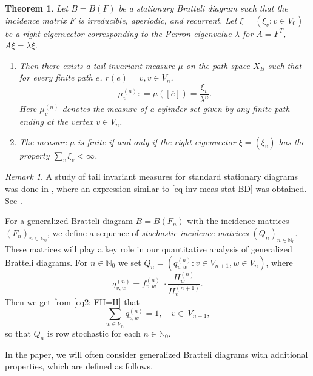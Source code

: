 \documentclass[11pt,reqno]{amsart}
\theoremstyle{definition}
\theoremstyle{remark}
\newtheorem{remark}[definition]{Remark}
\theoremstyle{plain}
\newtheorem{thm}[definition]{Theorem}
\def\ol{\overline}
\newcommand{\N}{\mathbb N}
\newcommand{\be}{\begin{equation}}
\newcommand{\ee}{\end{equation}}
\numberwithin{equation}{section}
\begin{document}
\begin{thm} \label{thm PFThm} Let $B = B(F)$ be a stationary Bratteli diagram such 
that the incidence matrix $F$ is 
irreducible, aperiodic, and recurrent. Let $\xi = (\xi_v : v \in V_0)$ be a right eigenvector corresponding to the Perron eigenvalue
$\lambda$ for $A= F^{T}$, $A\xi = \lambda \xi$. 

\begin{enumerate}
    \item Then there exists a tail invariant measure $\mu$ on the path space $X_B$ such that for every finite path $\ol e$, $r(\ol e) = v, v \in V_n $, 
 \be\label{eq inv meas stat BD}
\mu^{(n)}_v : =  \mu([\ol e]) = \frac{\xi_v}{\lambda^{n}}.
\ee 
Here $\mu^{(n)}_v$ denotes the measure of a cylinder set given by any finite path ending at the vertex $v \in V_n$.

\item The measure $\mu$ is finite if and only if the right eigenvector
$\xi = (\xi_v)$ has the property $\sum_v \xi_v <\infty$.
\end{enumerate}
\end{thm} 



\begin{remark}\label{Standard_stationary} A study of tail invariant measures for standard stationary diagrams was done in \cite{BezuglyiKwiatkowskiMedynetsSolomyak2010}, where an expression similar to \eqref{eq inv meas stat BD} was obtained. See \cite[Remark 3.9.]{BezuglyiKwiatkowskiMedynetsSolomyak2010}.
\end{remark}



For a generalized Bratteli diagram $B = B(F_n)$ with the incidence matrices $(F_n)_{n \in \N_0}$, we define a sequence of \textit{stochastic incidence matrices} $(Q_n)_{n \in \N_0}$. These matrices will play a key role in our quantitative analysis of generalized Bratteli diagrams. For $n \in \N_0$ we set
$Q_n = (q_{v,w}^{(n)} : v \in V_{n+1}, w \in V_n)$, where 
\be\label{eq_stoch matrix Q_n}
q_{v,w}^{(n)} =  {f}_{v,w}^{(n)}\ \cdot \frac{H_{w}^{(n)}}
{H_{v}^{(n + 1)}}.
\ee
Then we get from \eqref{eq2: FH=H} that 
\begin{equation}\label{e7}
\sum_{w \in V_{n}}q_{v,w}^{(n)} =1, \quad v \in\ 
V_{n + 1},  
\end{equation}
so that $Q_n$ is row stochastic for each $n \in \N_0$. 
\medskip 

In the paper, we will often consider generalized Bratteli diagrams with additional properties, which are defined as follows.
\end{document}
